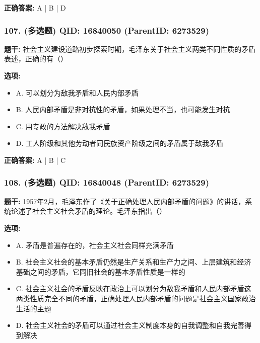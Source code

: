 \documentclass[12pt,UTF8]{ctexart}
\begin{document}
\textbf{正确答案:}
A | B | D

\vspace{0.3em}\hrulefill\vspace{0.7em}

\subsubsection*{107. (多选题) \small QID: 16840050 (ParentID: 6273529)}

\textbf{题干:}
社会主义建设道路初步探索时期，毛泽东关于社会主义两类不同性质的矛盾表述，正确的有（）



\textbf{选项:}
\begin{itemize}[leftmargin=*]

  \item A. 可以划分为敌我矛盾和人民内部矛盾

  \item B. 人民内部矛盾是非对抗性的矛盾，如果处理不当，也可能发生对抗

  \item C. 用专政的方法解决敌我矛盾

  \item D. 工人阶级和其他劳动者同民族资产阶级之间的矛盾属于敌我矛盾

\end{itemize}

\textbf{正确答案:}
A | B | C

\vspace{0.3em}\hrulefill\vspace{0.7em}

\subsubsection*{108. (多选题) \small QID: 16840048 (ParentID: 6273529)}

\textbf{题干:}
1957年2月，毛泽东作了《关于正确处理人民内部矛盾的问题》的讲话，系统论述了社会主义社会矛盾的理论。毛泽东指出（）



\textbf{选项:}
\begin{itemize}[leftmargin=*]

  \item A. 矛盾是普遍存在的，社会主义社会同样充满矛盾

  \item B. 社会主义社会的基本矛盾仍然是生产关系和生产力之间、上层建筑和经济基础之间的矛盾，它同旧社会的基本矛盾性质是一样的

  \item C. 社会主义社会的矛盾反映在政治上可以划分为敌我矛盾和人民内部矛盾这两类性质完全不同的矛盾，正确处理人民内部矛盾的问题是社会主义国家政治生活的主题

  \item D. 社会主义社会的矛盾可以通过社会主义制度本身的自我调整和自我完善得到解决

\end{itemize}
\end{document}
